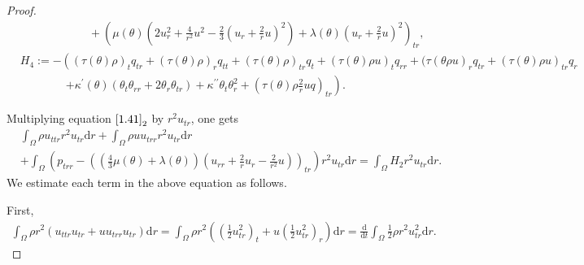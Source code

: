 \documentclass[11pt,reqno]{amsart}
\numberwithin{equation}{section}
\newcommand{\dif}{\mathrm{d}}
\begin{document}
\begin{proof}
\begin{align*}
&\qquad \qquad \qquad+ \left(\mu(\theta)\left( 2u_r^2+\frac{4}{r^2}u^2-\frac{2}{3} \left(u_r+\frac{2}{r} u\right)^2\right)+\lambda(\theta)\left(u_r+\frac{2}{r} u\right)^2 \right)_{tr},\\
& H_4:=-\left( (\tau(\theta) \rho)_t q_{tr}+(\tau(\theta) \rho)_r q_{tt}+(\tau(\theta) \rho)_{tr} q_t+(\tau(\theta) \rho u)_t q_{rr}+(\tau(\theta \rho u)_r q_{tr}+(\tau(\theta) \rho u)_{tr} q_r \right.\\
& \qquad\qquad\left.+\kappa^\prime(\theta)(\theta_t \theta_{rr}+2\theta_r \theta_{tr})+\kappa^{\prime\prime} \theta_t \theta_r^2+\left( \tau(\theta) \rho \frac{2}{r} u q \right)_{tr}\right).
 \end{align*}

 Multiplying equation $\eqref{1.41}_2$ by $r^2 u_{tr}$, one gets
 \begin{align}\label{1.42}
& \int_{\Omega} \rho u_{ttr} r^2 u_{tr}\dif r  +\int_{\Omega} \rho u u_{trr} r^2 u_{tr}\dif r\nonumber\\
&+\int_{\Omega} \left(p_{trr} -\left(\left(\frac{4}{3} \mu(\theta)+\lambda(\theta)\right)\left(u_{rr}+\frac{2}{r}u_r-\frac{2}{r^2} u\right)\right)_{tr}\right) r^2 u_{tr}\dif r
 =\int_{\Omega} H_2 r^2 u_{tr}\dif r.
 \end{align}
 We estimate each term in the above equation as follows.

 First,
 \begin{align*}
 \int_{\Omega} \rho r^2 ( u_{ttr} u_{tr}+u  u_{trr} u_{tr}) \dif r =\int_{\Omega} \rho r^2 \left(  \left( \frac{1}{2} u_{tr}^2 \right)_t+u \left(\frac{1}{2} u_{tr}^2\right)_r\right) \dif r=\frac{\dif}{\dif t} \int_{\Omega} \frac{1}{2} \rho r^2 u_{tr}^2 \dif r.
 \end{align*}


\end{proof}
\end{document}
